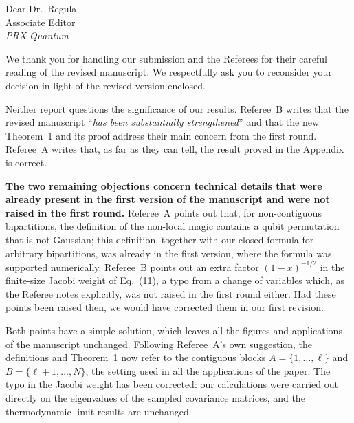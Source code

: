 \documentclass[11pt]{article}
\renewcommand{\emph}[1]{\textbf{#1}}
\begin{document}
\sloppy


\noindent
Dear Dr.\ Regula,\\
\noindent Associate Editor\\
\noindent \textit{PRX Quantum}\\

\bigskip

\noindent
We thank you for handling our submission and the Referees for their careful reading of the revised manuscript. We respectfully ask you to reconsider your decision in light of the revised version enclosed.

\medskip
\noindent
Neither report questions the significance of our results. Referee~B writes that the revised manuscript ``\textit{has been substantially strengthened}'' and that the new Theorem~1 and its proof address their main concern from the first round. Referee~A writes that, as far as they can tell, the result proved in the Appendix is correct.

\medskip
\noindent
\emph{The two remaining objections concern technical details that were already present in the first version of the manuscript and were not raised in the first round.} Referee~A points out that, for non-contiguous bipartitions, the definition of the non-local magic contains a qubit permutation that is not Gaussian; this definition, together with our closed formula for arbitrary bipartitions, was already in the first version, where the formula was supported numerically. Referee~B points out an extra factor $(1-x)^{-1/2}$ in the finite-size Jacobi weight of Eq.~(11), a typo from a change of variables which, as the Referee notes explicitly, was not raised in the first round either. Had these points been raised then, we would have corrected them in our first revision.

\medskip
\noindent
Both points have a simple solution, which leaves all the figures and applications of the manuscript unchanged. Following Referee~A's own suggestion, the definitions and Theorem~1 now refer to the contiguous blocks $A=\{1,\dots,\ell\}$ and $B=\{\ell+1,\dots,N\}$, the setting used in all the applications of the paper. The typo in the Jacobi weight has been corrected: our calculations were carried out directly on the eigenvalues of the sampled covariance matrices, and the thermodynamic-limit results are unchanged.
\end{document}
